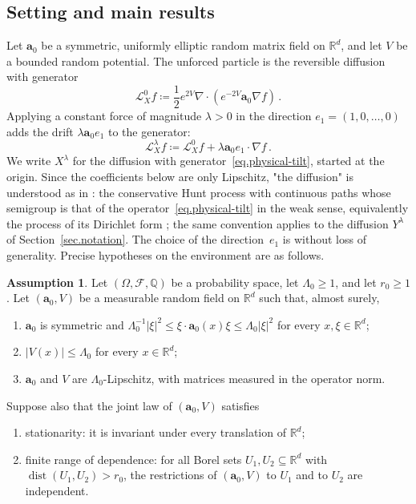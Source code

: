 \documentclass[11pt]{amsart}
\theoremstyle{definition}
\newtheorem{assumption}[proposition]{Assumption}
\theoremstyle{remark}
\numberwithin{equation}{section}
\newcommand{\Q}{\mathbb Q}
\newcommand{\R}{\mathbb R}
\renewcommand{\a}{\mathbf a}
\begin{document}
\subsection{Setting and main results}\label{ss.setting}

Let $\a_0$ be a symmetric, uniformly elliptic random matrix field on $\R^d$, and let $V$ be a bounded random potential. The unforced particle is the reversible diffusion with generator
\begin{equation}\label{eq.physical-generator}
 \mathcal L_X^0 f\coloneqq\frac12 e^{2V}\nabla\cdot(e^{-2V}\a_0\nabla f)\, .
\end{equation}
Applying a constant force of magnitude $\lambda>0$ in the direction $e_1=(1,0,\ldots,0)$ adds the drift $\lambda\a_0e_1$ to the generator:
\begin{equation}\label{eq.physical-tilt}
 \mathcal L_X^\lambda f\coloneqq\mathcal L_X^0f+\lambda\a_0e_1\cdot\nabla f\, .
\end{equation}
We write $X^\lambda$ for the diffusion with generator~\eqref{eq.physical-tilt}, started at the origin. Since the coefficients below are only Lipschitz, "the diffusion" is understood as in \citet[Section~7]{Einstein2012gantert}: the conservative Hunt process with continuous paths whose semigroup is that of the operator~\eqref{eq.physical-tilt} in the weak sense, equivalently the process of its Dirichlet form \citep[Lemma~7.1]{Einstein2012gantert}; the same convention applies to the diffusion $Y^\lambda$ of Section~\ref{sec.notation}. The choice of the direction~$e_1$ is without loss of generality. Precise hypotheses on the environment are as follows.

\begin{assumption}\label{a.environment}
Let $(\Omega,\mathcal F,\Q)$ be a probability space, let $\Lambda_0\geq1$, and let $r_0\geq1$. Let $(\a_0,V)$ be a measurable random field on $\R^d$ such that, almost surely,
\begin{enumerate}
\item[(S1)] $\a_0$ is symmetric and $\Lambda_0^{-1}|\xi|^2\leq\xi\cdot\a_0(x)\xi\leq\Lambda_0|\xi|^2$ for every $x,\xi\in\R^d$;
\item[(S2)] $|V(x)|\leq\Lambda_0$ for every $x\in\R^d$;
\item[(S3)] $\a_0$ and $V$ are $\Lambda_0$-Lipschitz, with matrices measured in the operator norm.
\end{enumerate}
Suppose also that the joint law of $(\a_0,V)$ satisfies
\begin{enumerate}
\item[(S4)] stationarity: it is invariant under every translation of $\R^d$;
\item[(S5)] finite range of dependence: for all Borel sets $U_1,U_2\subseteq\R^d$ with $\operatorname{dist}(U_1,U_2)>r_0$, the restrictions of $(\a_0,V)$ to $U_1$ and to $U_2$ are independent.
\end{enumerate}
\end{assumption}
\end{document}
